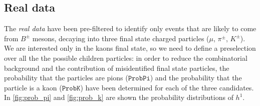 \begin{figure}[H]
	\centering
	\caption{} %
	\label{fig:inv_mass_sim}
\end{figure}


\subsection{Real data}

The \emph{real data} have been pre-filtered to identify only events that are likely to come from $B^{\pm}$ mesons, decaying into three final state charged particles ($\mu$, $\pi^{\pm}$, $K^{\pm}$). We are interested only in the kaons final state, so we need to define a preselection over all the the possible children particles: in order to reduce the combinatorial background and the contribution of misidentified final state particles, the probability that the particles are pions ($\texttt{ProbPi}$) and the probability that the particle is a kaon ($\texttt{ProbK}$) have been determined for each of the three candidates.
In \autoref{fig:prob_pi} and \autoref{fig:prob_k} are shown the probability distributions of $h^{1}$.


